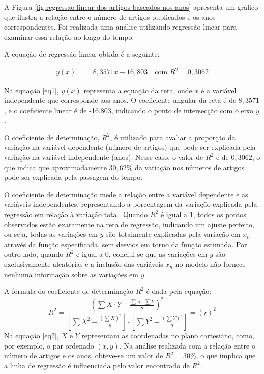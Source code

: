 


A Figura \ref{fig:regressao-linear-dos-artigos-baseados-nos-anos} apresenta um gráfico que ilustra a relação entre o número de artigos publicados e os anos correspondentes. Foi realizada uma análise utilizando regressão linear para examinar essa relação ao longo do tempo.

A equação de regressão linear obtida é a seguinte:

\begin{eqnarray}
	y(x) &=& 8,3571x - 16,803 \quad \text{com } R^2 = 0,3062\label{eq1}
\end{eqnarray}

Na equação \eqref{eq1}, $y(x)$ representa a equação da reta, onde $x$ é a variável independente que corresponde aos anos. O coeficiente angular da reta é de $ 8,3571$, e o coeficiente linear é de -16.803, indicando o ponto de intersecção com o eixo $y$.

O coeficiente de determinação, $R^2$, é utilizado para avaliar a proporção da variação na variável dependente (número de artigos) que pode ser explicada pela variação na variável independente (anos). Nesse caso, o valor de $R^2$ é de $0,3062$, o que indica que aproximadamente $30,62\%$ da variação nos números de artigos pode ser explicada pela passagem do tempo.

O coeficiente de determinação mede a relação entre a variável dependente e as variáveis independentes, representando a porcentagem da variação explicada pela regressão em relação à variação total. Quando $R^2$ é igual a 1, todos os pontos observados estão exatamente na reta de regressão, indicando um ajuste perfeito, ou seja, todas as variações em $y$ são totalmente explicadas pela variação em $x_n$ através da função especificada, sem desvios em torno da função estimada. Por outro lado, quando $R^2$ é igual a 0, conclui-se que as variações em $y$ são exclusivamente aleatórias e a inclusão das variáveis $x_n$ no modelo não fornece nenhuma informação sobre as variações em $y$.

A fórmula do coeficiente de determinação $R^2$ é dada pela equação:
\begin{equation}
	R^{2}=\frac{\left(\sum X \cdot Y-\frac{\sum X \cdot \sum Y}{n}\right)^{2}}{\left[\sum X^{2}-\frac{\left(\sum X\right)^{2}}{n}\right] \cdot\left[\sum Y^{2}-\frac{\left(\sum Y\right)^{2}}{n}\right]}=(r)^{2}\label{eq2}
\end{equation}
Na equação \eqref{eq2}, $X$ e $Y$ representam as coordenadas no plano cartesiano, como, por exemplo, o par ordenado $(x,y)$. Na análise realizada com a relação entre o número de artigos e os anos, obteve-se um valor de $R^2=30\%$, o que implica que a linha de regressão é influenciada pelo valor encontrado de $R^2$.

